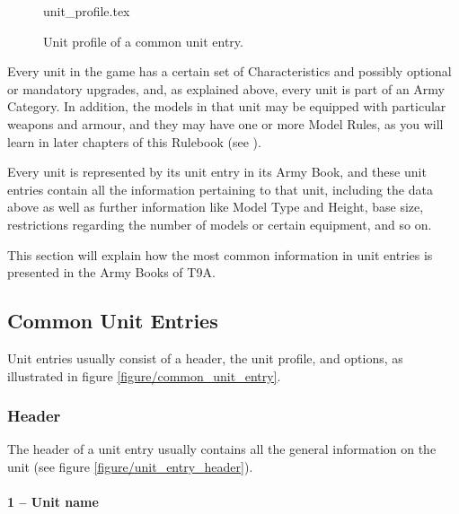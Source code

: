 \newcommand{\tinmenglobalrules}{\scoring{},\strider{} (\forest{})}
\newcommand{\tinmendefrules}{\la}
\newcommand{\tinmenoffrules}{\textbf{\tinmansheart}}
\newcommand{\tinmenoffweapons}{\halberd}

\newcommand{\figTINMENProfileEight}{8 -- Characteristic Profiles}
\newcommand{\figTINMENProfileNine}{9 -- Model Rules}

\begin{figure}[!b]
	\centering
	{unit_profile.tex}\vspace{-5pt}
	\caption{Unit profile of a common unit entry.}
	\label{figure/unit_profile}
	\vspace*{10pt}
\end{figure}

Every unit in the game has a certain set of Characteristics and possibly optional or mandatory upgrades, and, as explained above, every unit is part of an Army Category. In addition, the models in that unit may be equipped with particular weapons and armour, and they may have one or more Model Rules, as you will learn in later chapters of this Rulebook (see ).

Every unit is represented by its unit entry in its Army Book, and these unit entries contain all the information pertaining to that unit, including the data above as well as further information like Model Type and Height, base size, restrictions regarding the number of models or certain equipment, and so on.

This section will explain how the most common information in unit entries is presented in the Army Books of T9A.

\subsection{Common Unit Entries}

Unit entries usually consist of a header, the unit profile, and options, as illustrated in figure \ref{figure/common_unit_entry}.

\columnbreak

\subsubsection{Header}

The header of a unit entry usually contains all the general information on the unit (see figure \ref{figure/unit_entry_header}).

\paragraph{1 -- Unit name}

